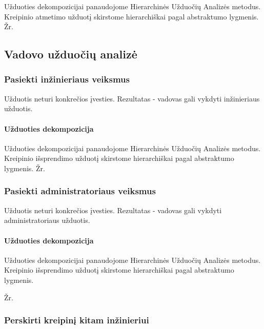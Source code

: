 	Užduoties dekompozicijai panaudojome Hierarchinės Užduočių Analizės metodus.
	Kreipinio atmetimo užduotį skirstome hierarchiškai pagal abstraktumo lygmenis. 
	Žr. 
	
 		
\subsection{Vadovo užduočių analizė}

	\subsubsection{Pasiekti inžinieriaus veiksmus}

	Užduotis neturi konkrečios įvesties. 
	Rezultatas - vadovas gali vykdyti inžinieriaus užduotis.
		
		
	\paragraph{Užduoties dekompozicija}
	

	Užduoties dekompozicijai panaudojome Hierarchinės Užduočių Analizės metodus.
	Kreipinio išsprendimo užduotį skirstome hierarchiškai pagal abstraktumo lygmenis. 
	Žr. 
 		
 		
	\subsubsection{Pasiekti administratoriaus veiksmus}

	Užduotis neturi konkrečios įvesties. 
	Rezultatas - vadovas gali vykdyti administratoriaus užduotis.
		
		
	\paragraph{Užduoties dekompozicija}
	

	Užduoties dekompozicijai panaudojome Hierarchinės Užduočių Analizės metodus.
	Kreipinio išsprendimo užduotį skirstome hierarchiškai pagal abstraktumo lygmenis. 
	
	Žr. 	
	
 		
	\subsubsection{Perskirti kreipinį kitam inžinieriui}

